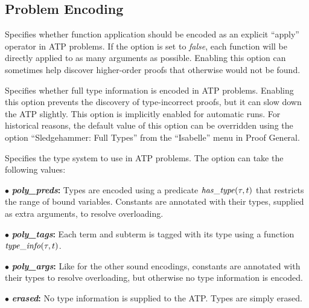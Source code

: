 \documentclass[a4paper,12pt]{article}
\begin{document}
\subsection{Problem Encoding}
\label{problem-encoding}

\begin{enum}
Specifies whether function application should be encoded as an explicit
``apply'' operator in ATP problems. If the option is set to \textit{false}, each
function will be directly applied to as many arguments as possible. Enabling
this option can sometimes help discover higher-order proofs that otherwise would
not be found.

Specifies whether full type information is encoded in ATP problems. Enabling
this option prevents the discovery of type-incorrect proofs, but it can slow
down the ATP slightly. This option is implicitly enabled for automatic runs. For
historical reasons, the default value of this option can be overridden using the
option ``Sledgehammer: Full Types'' from the ``Isabelle'' menu in Proof General.

Specifies the type system to use in ATP problems. The option can take the
following values:

\begin{enum}

\item[$\bullet$] \textbf{\textit{poly\_preds}:} Types are encoded using a predicate
$\mathit{has\_type\/}(\tau, t)$ that restricts the range of bound variables.
Constants are annotated with their types, supplied as extra arguments, to
resolve overloading.

\item[$\bullet$] \textbf{\textit{poly\_tags}:} Each term and subterm is tagged with
its type using a function $\mathit{type\_info\/}(\tau, t)$.

\item[$\bullet$] \textbf{\textit{poly\_args}:}
Like for the other sound encodings, constants are annotated with their types to
resolve overloading, but otherwise no type information is encoded.

\item[$\bullet$] \textbf{\textit{erased}:} No type information is supplied to
the ATP. Types are simply erased.


\end{enum}
\end{enum}
\end{document}
